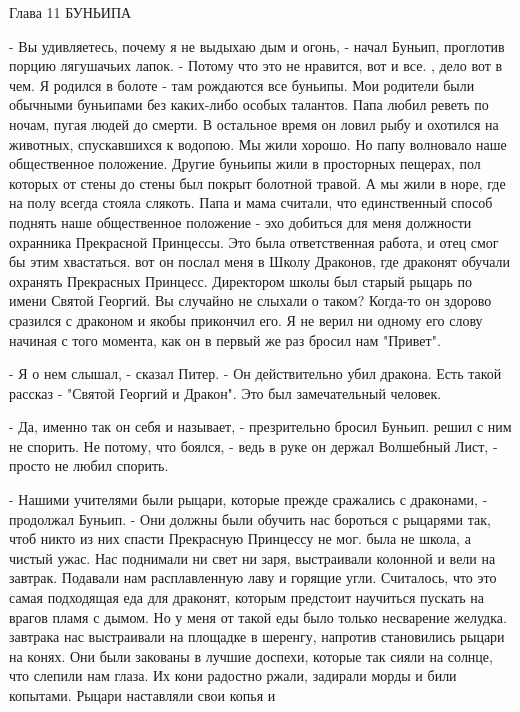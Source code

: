 Глава 11
 БУНЬИПА
\par\par- Вы удивляетесь, почему я не выдыхаю дым и огонь, - начал Буньип, 
проглотив порцию лягушачьих лапок. - Потому что это не нравится, вот и 
все.
, дело вот в чем. Я родился в болоте - там рождаются все 
буньипы. Мои родители были обычными буньипами без каких-либо особых 
талантов. Папа любил реветь по ночам, пугая людей до смерти. В 
остальное время он ловил рыбу и охотился на животных, спускавшихся к 
водопою. Мы жили хорошо. Но папу волновало наше общественное 
положение. Другие буньипы жили в просторных пещерах, пол которых от 
стены до стены был покрыт болотной травой. А мы жили в норе, где на 
полу всегда стояла слякоть. Папа и мама считали, что единственный 
способ поднять наше общественное положение - эхо добиться для меня 
должности охранника Прекрасной Принцессы. Это была ответственная 
работа, и отец смог бы этим хвастаться.
 вот он послал меня в Школу Драконов, где драконят обучали 
охранять Прекрасных Принцесс. Директором школы был старый рыцарь по 
имени Святой Георгий. Вы случайно не слыхали о таком? Когда-то он 
здорово сразился с драконом и якобы прикончил его. Я не верил ни 
одному его слову начиная с того момента, как он в первый же раз бросил 
нам "Привет".
\par- Я о нем слышал, - сказал Питер. - Он действительно убил дракона. 
Есть такой рассказ - "Святой Георгий и Дракон". Это был замечательный 
человек.
\par- Да, именно так он себя и называет, - презрительно бросил Буньип.
 решил с ним не спорить. Не потому, что боялся, - ведь в руке 
он держал Волшебный Лист, - просто не любил спорить.
\par- Нашими учителями были рыцари, которые прежде сражались с 
драконами, - продолжал Буньип. - Они должны были обучить нас бороться 
с рыцарями так, чтоб никто из них спасти Прекрасную Принцессу не мог.
 была не школа, а чистый ужас. Нас поднимали ни свет ни заря, 
выстраивали колонной и вели на завтрак. Подавали нам расплавленную 
лаву и горящие угли. Считалось, что это самая подходящая еда для 
драконят, которым предстоит научиться пускать на врагов пламя с дымом. 
Но у меня от такой еды было только несварение желудка.
 завтрака нас выстраивали на площадке в шеренгу, напротив 
становились рыцари на конях. Они были закованы в лучшие доспехи, 
которые так сияли на солнце, что слепили нам глаза. Их кони радостно 
ржали, задирали морды и били копытами. Рыцари наставляли свои копья и 
